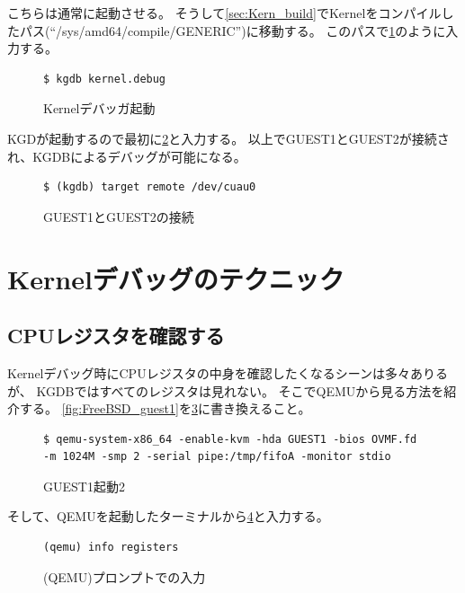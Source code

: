 \documentclass[a4j]{jarticle}
\begin{document}
こちらは通常に起動させる。
そうして\ref{sec:Kern_build}でKernelをコンパイルしたパス(``/sys/amd64/compile/GENERIC'')に移動する。
このパスで\ref{fig:FreeBSD_gdb}のように入力する。
\begin{figure}[htbp]
	\begin{center}
		\begin{lstlisting}[basicstyle=\ttfamily\footnotesize, frame=single, breaklines=true]
$ kgdb kernel.debug
		\end{lstlisting}
	\end{center}
	\caption{Kernelデバッガ起動}
	\label{fig:FreeBSD_gdb}
\end{figure}

KGDが起動するので最初に\ref{fig:FreeBSD_gdb_cuau0}と入力する。
以上でGUEST1とGUEST2が接続され、KGDBによるデバッグが可能になる。
\begin{figure}[htbp]
	\begin{center}
		\begin{lstlisting}[basicstyle=\ttfamily\footnotesize, frame=single, breaklines=true]
$ (kgdb) target remote /dev/cuau0
		\end{lstlisting}
	\end{center}
	\caption{GUEST1とGUEST2の接続}
	\label{fig:FreeBSD_gdb_cuau0}
\end{figure}

\section{Kernelデバッグのテクニック}
\subsection{CPUレジスタを確認する}
Kernelデバッグ時にCPUレジスタの中身を確認したくなるシーンは多々ありるが、
KGDBではすべてのレジスタは見れない。
そこでQEMUから見る方法を紹介する。
\ref{fig:FreeBSD_guest1}を\ref{fig:FreeBSD_guest1_reg}に書き換えること。
\begin{figure}[htbp]
	\begin{center}
		\begin{lstlisting}[basicstyle=\ttfamily\footnotesize, frame=single, breaklines=true]
$ qemu-system-x86_64 -enable-kvm -hda GUEST1 -bios OVMF.fd -m 1024M -smp 2 -serial pipe:/tmp/fifoA -monitor stdio
		\end{lstlisting}
	\end{center}
	\caption{GUEST1起動2}
	\label{fig:FreeBSD_guest1_reg}
\end{figure}
そして、QEMUを起動したターミナルから\ref{fig:QEMU_reg_chk}と入力する。
\begin{figure}[htbp]
	\begin{center}
		\begin{lstlisting}[basicstyle=\ttfamily\footnotesize, frame=single, breaklines=true]
(qemu) info registers
		\end{lstlisting}
	\end{center}
	\caption{(QEMU)プロンプトでの入力}
	\label{fig:QEMU_reg_chk}
\end{figure}
\end{document}
